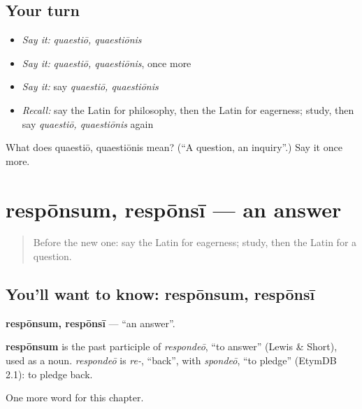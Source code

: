 \subsection*{Your turn}
\begin{itemize}
\raggedright
  \item \emph{Say it:} \emph{quaestiō, quaestiōnis}
  \item \emph{Say it:} \emph{quaestiō, quaestiōnis}, once more
  \item \emph{Say it:} say \emph{quaestiō, quaestiōnis}
  \item \emph{Recall:} say the Latin for philosophy, then the Latin for eagerness; study, then say \emph{quaestiō, quaestiōnis} again
\end{itemize}

\begin{tcolorbox}[breakable,colback=teal!4,colframe=teal!35!black,title={Before you move on}]
What does quaestiō, quaestiōnis mean? (\textquotedblleft{}A question, an inquiry\textquotedblright{}.) Say it once more.
\end{tcolorbox}
\section[respōnsum, respōnsī]{respōnsum, respōnsī — an answer}

\label{lesson:LA-C226-responsum}



\begin{quote}
Before the new one: say the Latin for eagerness; study, then the Latin for a question.
\end{quote}

\subsection*{You'll want to know: respōnsum, respōnsī}
\textbf{respōnsum, respōnsī} — \textquotedblleft{}an answer\textquotedblright{}.

\begin{cousinweb}
\textbf{respōnsum} is the past participle of \emph{respondeō}, \textquotedblleft{}to answer\textquotedblright{} (Lewis \& Short), used as a noun. \emph{respondeō} is \emph{re-}, \textquotedblleft{}back\textquotedblright{}, with \emph{spondeō}, \textquotedblleft{}to pledge\textquotedblright{} (EtymDB 2.1): to pledge back.
\end{cousinweb}

\begin{grammarlens}[title={What you've built}]
One more word for this chapter.
\end{grammarlens}

